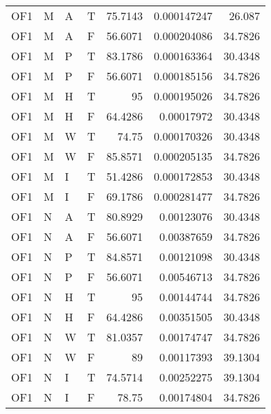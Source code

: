 \begin{tabular}{llllrrr}
    OF1      & M     & A     & T          & 75.7143    & 0.000147247 & 26.087   \\
    OF1      & M     & A     & F          & 56.6071    & 0.000204086 & 34.7826  \\
    OF1      & M     & P     & T          & 83.1786    & 0.000163364 & 30.4348  \\
    OF1      & M     & P     & F          & 56.6071    & 0.000185156 & 34.7826  \\
    OF1      & M     & H     & T          & 95         & 0.000195026 & 34.7826  \\
    OF1      & M     & H     & F          & 64.4286    & 0.00017972  & 30.4348  \\
    OF1      & M     & W     & T          & 74.75      & 0.000170326 & 30.4348  \\
    OF1      & M     & W     & F          & 85.8571    & 0.000205135 & 34.7826  \\
    OF1      & M     & I     & T          & 51.4286    & 0.000172853 & 30.4348  \\
    OF1      & M     & I     & F          & 69.1786    & 0.000281477 & 34.7826  \\
    OF1      & N     & A     & T          & 80.8929    & 0.00123076  & 30.4348  \\
    OF1      & N     & A     & F          & 56.6071    & 0.00387659  & 34.7826  \\
    OF1      & N     & P     & T          & 84.8571    & 0.00121098  & 30.4348  \\
    OF1      & N     & P     & F          & 56.6071    & 0.00546713  & 34.7826  \\
    OF1      & N     & H     & T          & 95         & 0.00144744  & 34.7826  \\
    OF1      & N     & H     & F          & 64.4286    & 0.00351505  & 30.4348  \\
    OF1      & N     & W     & T          & 81.0357    & 0.00174747  & 34.7826  \\
    OF1      & N     & W     & F          & 89         & 0.00117393  & 39.1304  \\
    OF1      & N     & I     & T          & 74.5714    & 0.00252275  & 39.1304  \\
    OF1      & N     & I     & F          & 78.75      & 0.00174804  & 34.7826  \\
    \hline
\end{tabular}